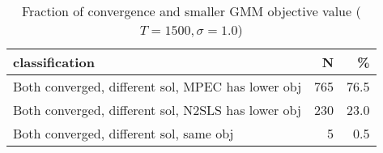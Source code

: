 \begin{table}

\caption{\label{tab:unnamed-chunk-22}Fraction of convergence and smaller GMM objective value ($T=1500,\sigma=1.0$)}
\centering
\begin{tabular}[t]{lrr}
\toprule
classification & N & \%\\
\midrule
Both converged, different sol, MPEC has lower obj & 765 & 76.5\\
Both converged, different sol, N2SLS has lower obj & 230 & 23.0\\
Both converged, different sol, same obj & 5 & 0.5\\
\bottomrule
\end{tabular}
\end{table}
